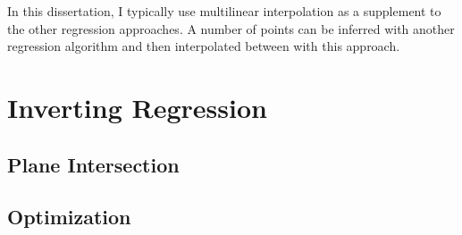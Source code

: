 In this dissertation, I typically use multilinear interpolation as a supplement to the other regression approaches.
A number of points can be inferred with another regression algorithm and then interpolated between with this approach.


\section{Inverting Regression}


\subsection{Plane Intersection}
   \cite{patrikalakis1993surface}



\subsection{Optimization}



